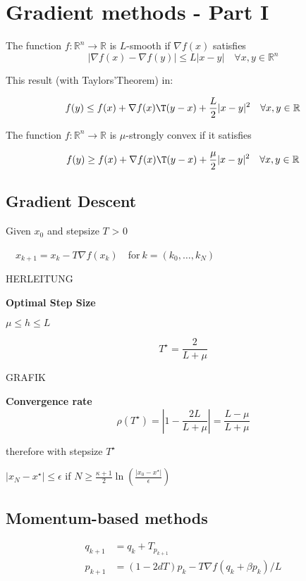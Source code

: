 \section{Gradient methods - Part I}

\begin{definition}[smoothness]
	The function $f : \mathbb{R}^{n}\rightarrow \mathbb{R}$ is $L$-smooth
	if $\nabla f(x)$ satisfies
	\[|\nabla f(x)-\nabla f(y)|\le L|x-y| \quad \forall x,y \in \mathbb{R}^{n}\]
\end{definition}

This result (with Taylors'Theorem) in:

\[f(y)\le f(x)+\nabla f(x)\T (y-x) +\frac{L}{2}|x-y|^2 \quad \forall x,y \in \mathbb{R}^{}\]

\begin{definition}
	The function $f : \mathbb{R}^{n}\rightarrow \mathbb{R}$ is $\mu$-strongly convex
	if it satisfies

	\[f(y)\ge f(x)+\nabla f(x)\T (y-x) +\frac{\mu}{2}|x-y|^2 \quad \forall x,y \in \mathbb{R}^{}\]
\end{definition}

\subsection{Gradient Descent}

Given $x_0$ and stepsize $T$ > 0

$\quad x_{k+1}=x_k - T\nabla f(x_k)\quad$for$\ k = (k_0,\dots,k_N)$

HERLEITUNG

\textbf{Optimal Step Size}

$\mu \le h \le L$

\[T^\star = \frac{2}{L+\mu}  \]

GRAFIK

\textbf{Convergence rate}
$$\rho (T^\star) = |1-\frac{2L}{L+\mu}|= \frac{L-\mu}{L+\mu}$$

therefore with stepsize $T^\star$

$|x_N - x^\star| \le \epsilon $
if $N \ge \frac{\kappa+1}{2}\operatorname{ln}(\frac{|x_0 - x^\star|}{\epsilon})$

\subsection{Momentum-based methods}
\begin{equation}
	\begin{aligned}
		q_{k+1} & = q_k + T_{p_{k+1}}                       \\
		p_{k+1} & = (1-2dT)p_k-T\nabla f(q_k + \beta p_k)/L
	\end{aligned}
\end{equation}

